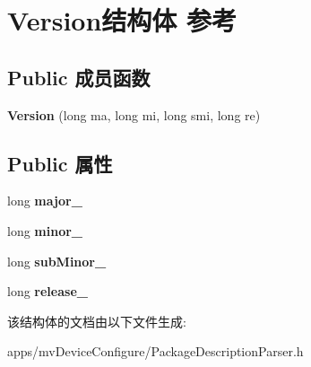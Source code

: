 \hypertarget{struct_version}{\section{Version结构体 参考}
\label{struct_version}
}
\subsection*{Public 成员函数}
\begin{DoxyCompactItemize}
\item 
\hypertarget{struct_version_a4d3bc3c6d845cee2ceb169364ebdd2a0}{{\bfseries Version} (long ma, long mi, long smi, long re)}\label{struct_version_a4d3bc3c6d845cee2ceb169364ebdd2a0}

\end{DoxyCompactItemize}
\subsection*{Public 属性}
\begin{DoxyCompactItemize}
\item 
\hypertarget{struct_version_a8e5e7e58a984ba23d2f5ad22d5ae5562}{long {\bfseries major\+\_\+}}\label{struct_version_a8e5e7e58a984ba23d2f5ad22d5ae5562}

\item 
\hypertarget{struct_version_a542dacdb92ba849ef5cb7f5a51fbb373}{long {\bfseries minor\+\_\+}}\label{struct_version_a542dacdb92ba849ef5cb7f5a51fbb373}

\item 
\hypertarget{struct_version_a2a3d622e4cd7343cb46daba96ec60dc1}{long {\bfseries sub\+Minor\+\_\+}}\label{struct_version_a2a3d622e4cd7343cb46daba96ec60dc1}

\item 
\hypertarget{struct_version_a1f5e740b50c6175e8e8697ddb579d85c}{long {\bfseries release\+\_\+}}\label{struct_version_a1f5e740b50c6175e8e8697ddb579d85c}

\end{DoxyCompactItemize}


该结构体的文档由以下文件生成\+:\begin{DoxyCompactItemize}
\item 
apps/mv\+Device\+Configure/Package\+Description\+Parser.\+h\end{DoxyCompactItemize}
